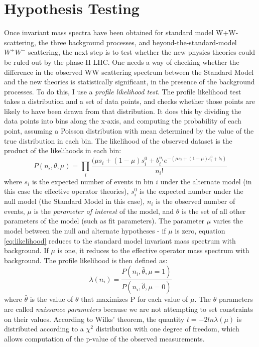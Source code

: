 \documentclass[10pt]{ucscthesisbs}
\begin{document}
\section{Hypothesis Testing}
Once invariant mass spectra have been obtained for standard model W+W- scattering, the three background processes, and beyond-the-standard-model $W^+W^-$ scattering, the next step is to test whether the new physics theories could be ruled out by the phase-II LHC. One needs a way of checking whether the difference in the observed WW scattering spectrum between the Standard Model and the new theories is statistically significant, in the presence of the background processes. To do this, I use a \textit{profile likelihood test}. The profile likelihood test takes a distribution and a set of data points, and checks whether those points are likely to have been drawn from that distribution. It does this by dividing the data points into bins along the x-axis, and computing the probability of each point, assuming a Poisson distribution with mean determined by the value of the true distribution in each bin.\cite{ranucci} The likelihood of the observed dataset is the product of the likelihoods in each bin:
\begin{equation} \label{eq:likelihood}
P(n_i, \theta, \mu) = \prod_{i}{\frac{(\mu s_i + (1 - \mu)s^0_i + b_i^{n_i} e^{-(\mu s_i + (1 - \mu)s^0_i + b_i)}}{n_i!}}
\end{equation}
where $s_i$ is the expected number of events in bin $i$ under the alternate model (in this case the effective operator theories), $s^0_i$ is the expected number under the null model (the Standard Model in this case), $n_i$ is the observed number of events, $\mu$ is the \textit{parameter of interest} of the model, and $\theta$ is the set of all other parameters of the model (such as fit parameters). The parameter $\mu$ varies the model between the null and alternate hypotheses - if $\mu$ is zero, equation \ref{eq:likelihood} reduces to the standard model invariant mass spectrum with background. If $\mu$ is one, it reduces to the effective operator mass spectrum with background. The profile likelihood is then defined as:
\begin{equation} \label{eq:proflikelihood}
\lambda(n_i) = \frac{P(n_i, \hat{\theta}, \mu = 1)}{P(n_i, \hat{\theta}, \mu = 0)}
\end{equation}
where $\hat{\theta}$ is the value of $\theta$ that maximizes P for each value of $\mu$. The $\theta$ parameters are called \textit{nuissance parameters} because we are not attempting to set constraints on their values. According to Wilks' theorem, the quantity $t = -2ln\lambda(\mu)$ is distributed according to a $\chi^2$ distribution with one degree of freedom, which allows computation of the p-value of the observed measurements. \par
\end{document}
